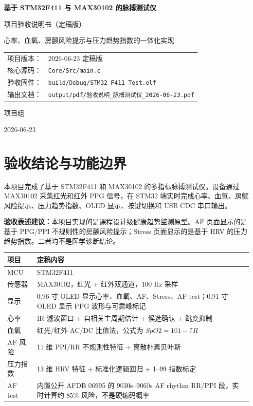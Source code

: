 \documentclass[10.5pt,a4paper,UTF8]{ctexart}
\newcommand{\keybox}[2]{
  \vspace{0.4em}
  \noindent
  \colorbox{#1}{%
    \parbox{\dimexpr\linewidth-2\fboxsep\relax}{#2}%
  }
  \vspace{0.4em}
}
\begin{document}
\begin{titlepage}
  \centering
  \vspace*{22mm}
  {\Huge\bfseries\color{mainblue} 基于 STM32F411 与 MAX30102 的脉搏测试仪\par}
  \vspace{8mm}
  {\LARGE 项目验收说明书（定稿版）\par}
  \vspace{12mm}
  {\large 心率、血氧、房颤风险提示与压力趋势指数的一体化实现\par}
  \vfill
  \begin{tabular}{rl}
    项目版本： & 2026-06-23 定稿版 \\
    核心源码： & \texttt{Core/Src/main.c} \\
    验收固件： & \texttt{build/Debug/STM32\_F411\_Test.elf} \\
    输出文档： & \texttt{output/pdf/验收说明\_脉搏测试仪\_2026-06-23.pdf} \\
  \end{tabular}
  \vfill
  {\large 项目组\par}
  {\large 2026-06-23\par}
\end{titlepage}

\tableofcontents
\newpage

\section{验收结论与功能边界}

本项目完成了基于 STM32F411 和 MAX30102 的多指标脉搏测试仪。设备通过 MAX30102 采集红光和红外 PPG 信号，在 STM32 端实时完成心率、血氧、房颤风险提示、压力趋势指数、OLED 显示、按键切换和 USB CDC 串口输出。

\keybox{softblue}{
\textbf{验收表述建议：}本项目实现的是课程设计级健康趋势监测原型。AF 页面显示的是基于 PPG/PPI 不规则性的房颤风险提示；Stress 页面显示的是基于 HRV 的压力趋势指数。二者均不是医学诊断结论。
}

\begin{longtable}{@{}L{3.2cm}L{10.8cm}@{}}
\toprule
项目 & 定稿内容 \\
\midrule
MCU & STM32F411 \\
传感器 & MAX30102，红光 + 红外双通道，100 Hz 采样 \\
显示 & 0.96 寸 OLED 显示心率、血氧、AF、Stress、AF test；0.91 寸 OLED 显示 PPG 波形与可靠峰标记 \\
心率 & IR 滤波窗口 + 自相关主周期估计 + 候选确认 + 跳变抑制 \\
血氧 & 红光/红外 AC/DC 比值法，公式为 \(SpO2=101-7R\) \\
AF 风险 & 11 维 PPI/RR 不规则性特征 + 离散朴素贝叶斯 \\
压力指数 & 13 维 HRV 特征 + 标准化逻辑回归 + 1--99 指数标定 \\
AF test & 内置公开 AFDB 06995 的 9030s--9060s AF rhythm RR/PPI 段，实时计算约 85\% 风险，不是硬编码概率 \\
\bottomrule
\end{longtable}
\end{document}
